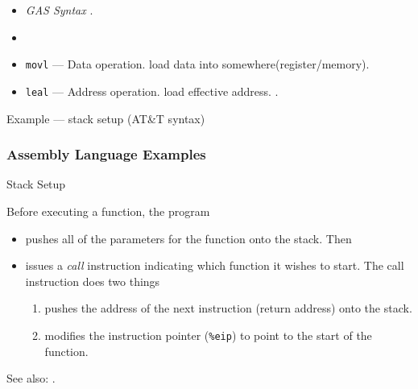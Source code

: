 \begin{itemize}
\item \emph{GAS Syntax} .
\item {}
\item \texttt{movl} --- Data operation. load data into somewhere(register/memory).
\item \texttt{leal} --- Address operation. load effective address. .
\end{itemize}

\begin{frame}
  \begin{block}{Example --- stack setup \scriptsize{(AT\&T syntax)}}
      \begin{center}
      \end{center}
  \end{block}
\end{frame}

\subsubsection{Assembly Language Examples}

\begin{frame}{Stack Setup}
  \begin{block}{Before executing a function, the program}
    \begin{itemize}
    \item pushes all of the parameters for the function onto the stack. Then
    \item issues a \emph{call} instruction indicating which function it wishes
      to start. The call instruction does two things
      \begin{enumerate}
      \item pushes the address of the next instruction (return address) onto the
        stack.
      \item modiﬁes the instruction pointer (\texttt{\%eip}) to point to the start
        of the function.
      \end{enumerate}
    \end{itemize}
  \end{block}
\end{frame}

See also: .

